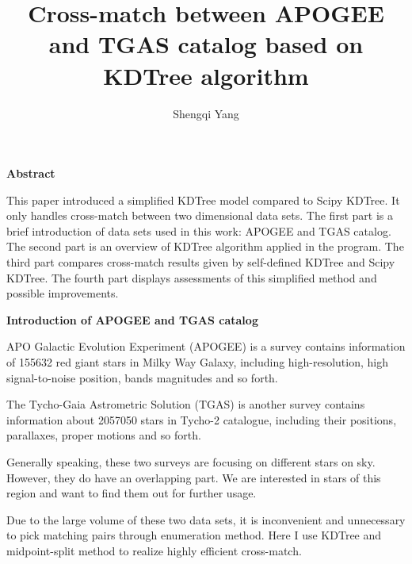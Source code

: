 \documentclass{article}
\begin{document}
\title{Cross-match between APOGEE and TGAS catalog based on KDTree algorithm}
\author{Shengqi Yang}
\maketitle

\begin{center}
\textbf{Abstract}\par
\end{center}
\par
\parindent=19pt
	This paper introduced a simplified KDTree model compared to Scipy KDTree. It only handles cross-match between two dimensional data sets. The first part is a brief introduction of data sets used in this work: APOGEE and TGAS catalog. The second part is an overview of KDTree algorithm applied in the program. The third part compares cross-match results given by self-defined KDTree and Scipy KDTree. The fourth part displays assessments of this simplified method and possible improvements.\par
\vspace{12pt}

\textbf{Introduction of APOGEE and TGAS catalog}\par
\vspace{12pt}
	APO Galactic Evolution Experiment (APOGEE) is a survey contains information of 155632 red giant stars in Milky Way Galaxy, including high-resolution, high signal-to-noise position, bands magnitudes and so forth. \par
	The Tycho-Gaia Astrometric Solution (TGAS) is another survey contains information about 2057050 stars in Tycho-2 catalogue, including their positions, parallaxes, proper motions and so forth.\par
	Generally speaking, these two surveys are focusing on different stars on sky. However, they do have an overlapping part. We are interested in stars of this region and want to find them out for further usage.\par
	Due to the large volume of these two data sets, it is inconvenient and unnecessary to pick matching pairs through enumeration method. Here I use KDTree and midpoint-split method to realize highly efficient cross-match.\par
\end{document}
